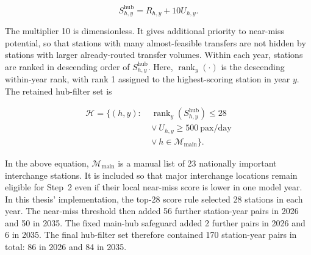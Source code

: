 \documentclass[preprint,12pt]{elsarticle}
\begin{document}
\begin{equation}
S^{\mathrm{hub}}_{h,y}
=
R_{h,y}
+
10U_{h,y}.
\label{eq:part2-step2-hub-score}
\end{equation}

The multiplier 10 is dimensionless. It gives additional priority to near-miss potential, so that stations with many almost-feasible transfers are not hidden by stations with larger already-routed transfer volumes. Within each year, stations are ranked in descending order of \(S^{\mathrm{hub}}_{h,y}\). Here, \(\operatorname{rank}_y(\cdot)\) is the descending within-year rank, with rank 1 assigned to the highest-scoring station in year \(y\). The retained hub-filter set is

\begin{equation}
\begin{aligned}
\mathcal{H}
=
\{(h,y):\;&
\operatorname{rank}_y(S^{\mathrm{hub}}_{h,y})\le 28\\
&\lor\ U_{h,y}\ge 500\ \mathrm{pax/day}\\
&\lor\ h\in\mathcal{M}_{\mathrm{main}}
\}.
\end{aligned}
\label{eq:part2-step2-hub-scope}
\end{equation}

In the above equation, \(\mathcal{M}_{\mathrm{main}}\) is a manual list of 23 nationally important interchange stations. It is included so that major interchange locations remain eligible for Step~2 even if their local near-miss score is lower in one model year. In this thesis' implementation, the top-28 score rule selected 28 stations in each year. The near-miss threshold then added 56 further station-year pairs in 2026 and 50 in 2035. The fixed main-hub safeguard added 2 further pairs in 2026 and 6 in 2035. The final hub-filter set therefore contained 170 station-year pairs in total: 86 in 2026 and 84 in 2035.
\end{document}

